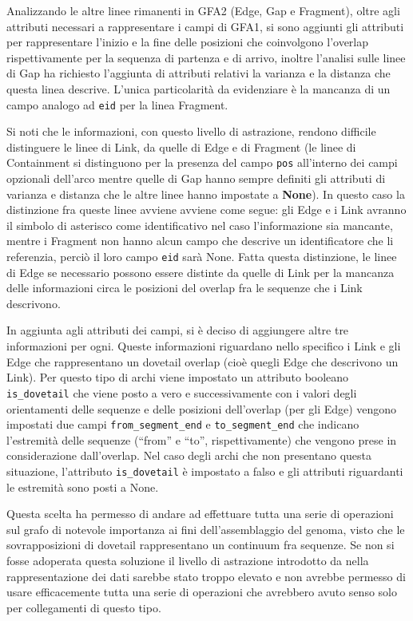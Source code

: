 Analizzando le altre linee rimanenti in GFA2 (Edge, Gap e Fragment), oltre agli attributi
necessari a rappresentare i campi di GFA1, si sono aggiunti gli attributi per
rappresentare l'inizio e la fine delle posizioni che coinvolgono l'overlap rispettivamente
per la sequenza di partenza e di arrivo, inoltre l'analisi sulle linee di Gap
ha richiesto l'aggiunta di attributi relativi la varianza e la distanza che questa linea
descrive. L'unica particolarità da evidenziare è la mancanza di un campo
analogo ad \texttt{eid} per la linea Fragment.

Si noti che le informazioni, con questo livello di astrazione, rendono difficile distinguere
le linee di Link, da quelle di Edge e di Fragment (le linee di Containment si distinguono
per la presenza del campo \texttt{pos} all'interno dei campi opzionali dell'arco mentre
quelle di Gap hanno sempre definiti gli attributi di varianza e distanza che le altre linee
hanno impostate a \textbf{None}). In questo caso la distinzione fra queste linee avviene avviene come
segue: gli Edge e i Link avranno il simbolo di asterisco come
identificativo nel caso l'informazione sia mancante,  mentre i Fragment
non hanno alcun campo che descrive un identificatore che li referenzia, perciò
il loro campo \texttt{eid} sarà None. Fatta questa distinzione, le linee di Edge se necessario
possono essere distinte da quelle di Link per la mancanza delle informazioni
circa le posizioni del overlap fra le sequenze che i Link descrivono.

In aggiunta agli attributi dei campi, si è deciso di aggiungere altre
tre informazioni per ogni.
Queste informazioni riguardano nello specifico i Link e gli Edge che
rappresentano un dovetail overlap (cioè quegli Edge che descrivono un Link).
Per questo tipo di archi viene impostato un attributo booleano \texttt{is\_dovetail}
che viene posto a vero e successivamente con i valori degli orientamenti
delle sequenze e delle posizioni dell'overlap (per gli Edge) vengono impostati
due campi \texttt{from\_segment\_end} e \texttt{to\_segment\_end} che indicano
l'estremità delle sequenze (``from'' e ``to'', rispettivamente) che vengono
prese in considerazione dall'overlap. Nel caso degli archi che non presentano
questa situazione, l'attributo \texttt{is\_dovetail} è impostato a falso e
gli attributi riguardanti le estremità sono posti a None.

Questa scelta ha permesso di andare ad effettuare tutta una serie di operazioni
sul grafo di notevole importanza ai fini dell'assemblaggio del genoma, visto che
le sovrapposizioni di dovetail rappresentano un continuum fra sequenze.
Se non si fosse adoperata questa soluzione il livello di astrazione introdotto da \pygfa
nella rappresentazione dei dati sarebbe stato troppo elevato e non avrebbe
permesso di usare efficacemente tutta una serie di operazioni che avrebbero
avuto senso solo per collegamenti di questo tipo.

